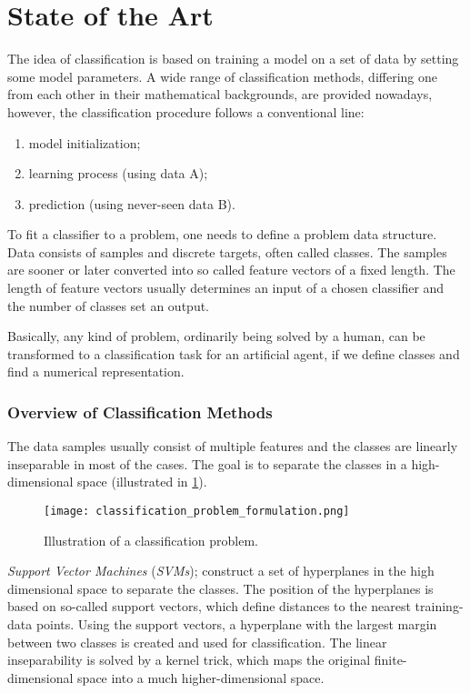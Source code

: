 \section{State of the Art} \label{sec:soa}
The idea of classification is based on training a model on a set of data by setting some model parameters. A wide range of classification methods, differing one from each other in their mathematical backgrounds, are provided nowadays, however, the classification procedure follows a conventional line:

\begin{enumerate}
\item model initialization;
\item learning process (using data A);
\item prediction (using never-seen data B).
\end{enumerate}

To fit a classifier to a problem, one needs to define a problem data structure. Data consists of samples and discrete targets, often called classes. The samples are sooner or later converted into so called feature vectors of a fixed length. The length of feature vectors usually determines an input of a chosen classifier and the number of classes set an output.

Basically, any kind of problem, ordinarily being solved by a human, can be transformed to a classification task for an artificial agent, if we define classes and find a numerical representation.

\subsubsection*{Overview of Classification Methods} \label{ssec:other_classification_methods}
The data samples usually consist of multiple features and the classes are linearly inseparable in most of the cases. The goal is to separate the classes in a high-dimensional space (illustrated in \cref{img:classification_problem_formulation}).

\begin{figure}[H]
  \centering
  \texttt{[image: classification\_problem\_formulation.png]}
  \caption{Illustration of a classification problem.}
  \label{img:classification_problem_formulation}
\end{figure}

\textit{Support Vector Machines} (\textit{SVMs}); \citep{article:svm} construct a set of hyperplanes in the high dimensional space to separate the classes. The position of the hyperplanes is based on so-called support vectors, which define distances to the nearest training-data points. Using the support vectors, a hyperplane with the largest margin between two classes is created and used for classification. The linear inseparability is solved by a kernel trick, which maps the original finite-dimensional space into a much higher-dimensional space.


